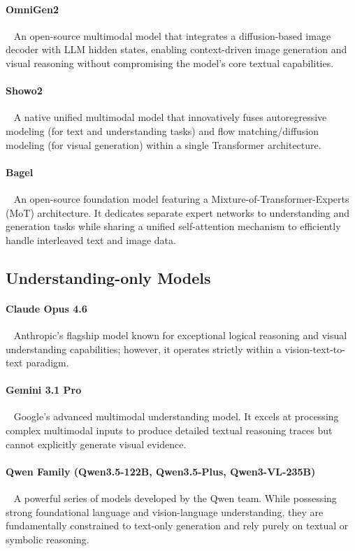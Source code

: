 \documentclass[11pt]{article}
\begin{document}
\paragraph{OmniGen2}~\cite{omnigen2} An open-source multimodal model that integrates a diffusion-based image decoder with LLM hidden states, enabling context-driven image generation and visual reasoning without compromising the model's core textual capabilities.

\paragraph{Showo2}~\cite{show} A native unified multimodal model that innovatively fuses autoregressive modeling (for text and understanding tasks) and flow matching/diffusion modeling (for visual generation) within a single Transformer architecture.

\paragraph{Bagel}~\cite{bagel} An open-source foundation model featuring a Mixture-of-Transformer-Experts (MoT) architecture. It dedicates separate expert networks to understanding and generation tasks while sharing a unified self-attention mechanism to efficiently handle interleaved text and image data.

\subsection{Understanding-only Models}

\paragraph{Claude Opus 4.6}~\cite{anthropic_claude_opus46_2026} Anthropic's flagship model known for exceptional logical reasoning and visual understanding capabilities; however, it operates strictly within a vision-text-to-text paradigm.

\paragraph{Gemini 3.1 Pro}~\cite{google_gemini31_pro_2026}  Google's advanced multimodal understanding model. It excels at processing complex multimodal inputs to produce detailed textual reasoning traces but cannot explicitly generate visual evidence.

\paragraph{Qwen Family (Qwen3.5-122B, Qwen3.5-Plus, Qwen3-VL-235B)}~\cite{qwen2026qwen35,qwen3vl} A powerful series of models developed by the Qwen team. While possessing strong foundational language and vision-language understanding, they are fundamentally constrained to text-only generation and rely purely on textual or symbolic reasoning.
\end{document}
